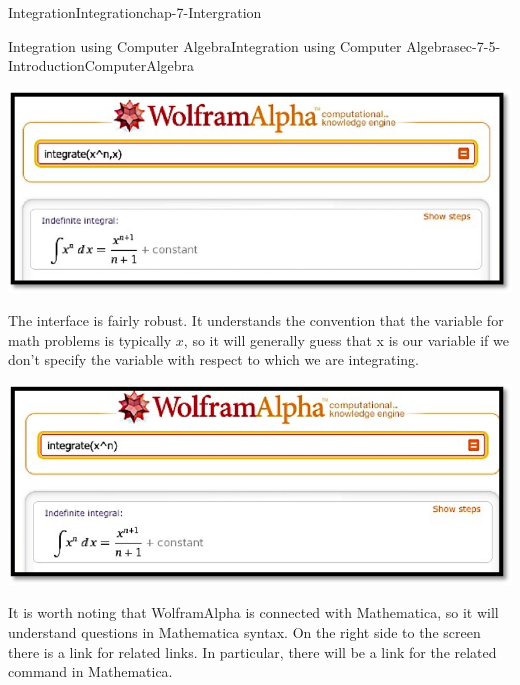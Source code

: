 \documentclass[oneside,10pt,]{book}
\numberwithin{equation}{section}
\begin{document}
\begin{chapterptx}{Integration}{}{Integration}{}{}{chap-7-Intergration}
\begin{sectionptx}{Integration using Computer Algebra}{}{Integration using Computer Algebra}{}{}{sec-7-5-IntroductionComputerAlgebra}
\begin{sidebyside}{1}{0.15}{0.15}{0}
\begin{sbspanel}{0.7}%
\includegraphics[width=1\linewidth]{images/sec7-5-3.png}
\end{sbspanel}%
\end{sidebyside}%
\par
\hypertarget{p-2885}{}%
The interface is fairly robust.  It understands the convention that the variable for math problems is typically \(x\), so it will generally guess that x is our variable if we don't specify the variable with respect to which we are integrating.%
\begin{sidebyside}{1}{0.15}{0.15}{0}%
\begin{sbspanel}{0.7}%
\includegraphics[width=1\linewidth]{images/sec7-5-4.png}
\end{sbspanel}%
\end{sidebyside}%
\par
\hypertarget{p-2886}{}%
It is worth noting that Wolfram\textbar{}Alpha is connected with Mathematica, so it will understand questions in Mathematica syntax.  On the right side to the screen there is a link for related links.  In particular, there will be a link for the related command in Mathematica.%
\begin{sidebyside}{1}{0.25}{0.25}{0}%
\begin{sbspanel}{0.5}%

\end{sbspanel}
\end{sidebyside}
\end{sectionptx}
\end{chapterptx}
\end{document}
